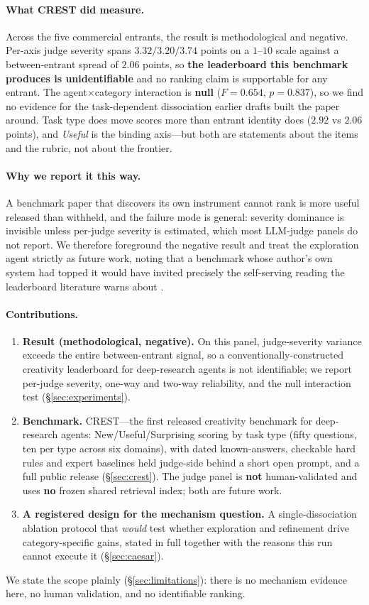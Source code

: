 \paragraph{What CREST did measure.} Across the five commercial entrants, the result is
methodological and negative. Per-axis judge severity spans $3.32/3.20/3.74$ points on a $1$--$10$
scale against a between-entrant spread of $2.06$ points, so \textbf{the leaderboard this benchmark
produces is unidentifiable} and no ranking claim is supportable for any entrant. The
agent$\times$category interaction is \textbf{null} ($F=0.654$, $p=0.837$), so we find no evidence
for the task-dependent dissociation earlier drafts built the paper around. Task type does move
scores more than entrant identity does ($2.92$ vs $2.06$ points), and \emph{Useful} is the binding
axis---but both are statements about the items and the rubric, not about the frontier.

\paragraph{Why we report it this way.} A benchmark paper that discovers its own instrument cannot
rank is more useful released than withheld, and the failure mode is general: severity dominance is
invisible unless per-judge severity is estimated, which most LLM-judge panels do not report. We
therefore foreground the negative result and treat the exploration agent strictly as future work,
noting that a benchmark whose author's own system had topped it would have invited precisely the
self-serving reading the leaderboard literature warns about \citep{singh2025leaderboard}.

\paragraph{Contributions.}
\begin{enumerate}
  \item \textbf{Result (methodological, negative).} On this panel, judge-severity variance exceeds
    the entire between-entrant signal, so a conventionally-constructed creativity leaderboard for
    deep-research agents is not identifiable; we report per-judge severity, one-way and two-way
    reliability, and the null interaction test (\S\ref{sec:experiments}).
  \item \textbf{Benchmark.} CREST---the first released creativity benchmark for deep-research
    agents: New/Useful/Surprising scoring by task type (fifty questions, ten per type across six
    domains), with dated known-answers, checkable hard rules and expert baselines held judge-side
    behind a short open prompt, and a full public release (\S\ref{sec:crest}). The judge panel is
    \textbf{not} human-validated and uses \textbf{no} frozen shared retrieval index; both are future
    work.
  \item \textbf{A registered design for the mechanism question.} A single-dissociation ablation
    protocol that \emph{would} test whether exploration and refinement drive category-specific
    gains, stated in full together with the reasons this run cannot execute it
    (\S\ref{sec:caesar}).
\end{enumerate}

We state the scope plainly (\S\ref{sec:limitations}): there is no mechanism evidence here, no human
validation, and no identifiable ranking.
